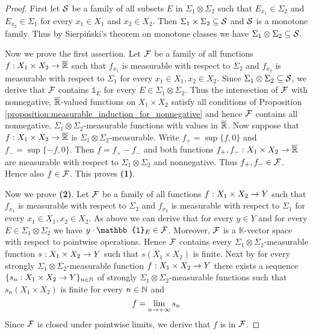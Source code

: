 \begin{proof}
    First let ${\mathcal S}$ be a family of all subsets $E$ in $\Sigma_1\otimes \Sigma_2$ such that $E_{x_1}\in \Sigma_2$ and $E_{x_2}\in \Sigma_1$ for every $x_1\in X_1$ and $x_2\in X_2$. Then $\Sigma_1\times \Sigma_2\subseteq {\mathcal S}$ and ${\mathcal S}$ is a monotone family. Thus by Sierpiński's theorem on monotone classes we have $\Sigma_1\otimes \Sigma_2\subseteq {\mathcal S}$.

    Now we prove the first assertion. Let ${\mathcal F}$ be a family of all functions $f:X_1\times X_2\rightarrow \overline{{\mathbb R}}$ such that $f_{x_1}$ is measurable with respect to $\Sigma_2$ and $f_{x_2}$ is measurable with respect to $\Sigma_1$ for every $x_1\in X_1,x_2\in X_2$. Since $\Sigma_1\otimes \Sigma_2\subseteq {\mathcal S}$, we derive that ${\mathcal F}$ contains $\mathbb{1}_E$ for every $E\in \Sigma_1\otimes \Sigma_2$. Thus the intersection of ${\mathcal F}$ with nonnegative, $\overline{{\mathbb R}}$-valued functions on $X_1\times X_2$ satisfy all conditions of Proposition \ref{proposition:measurable_induction_for_nonnegative} and hence ${\mathcal F}$ contains all nonnegative, $\Sigma_1\otimes \Sigma_2$-measurable functions with values in $\overline{{\mathbb R}}$. Now suppose that $f:X_1\times X_2\rightarrow \overline{{\mathbb R}}$ is $\Sigma_1\otimes \Sigma_2$-measurable. Write $f_+ = \sup\{f, 0\}$ and $f_- = \sup\{-f, 0\}$. Then $f = f_+ - f_-$ and both functions $f_+,f_-:X_1\times X_2\rightarrow \overline{{\mathbb R}}$ are measurable with respect to $\Sigma_1\otimes \Sigma_2$ and nonnegative. Thus $f_+,f_-\in {\mathcal F}$. Hence also $f\in {\mathcal F}$. This proves \textbf{(1)}.

    Now we prove \textbf{(2)}. Let ${\mathcal F}$ be a family of all functions $f:X_1\times X_2\rightarrow Y$ such that $f_{x_1}$ is measurable with respect to $\Sigma_2$ and $f_{x_2}$ is measurable with respect to $\Sigma_1$ for every $x_1\in X_1,x_2\in X_2$. As above we can derive that for every $y\in Y$ and for every $E\in \Sigma_1\otimes \Sigma_2$ we have $y\cdot \mathbb{1}_E\in \cF$. Moreover, ${\mathcal F}$ is a $\mathbb{K}$-vector space with respect to pointwise operations. Hence ${\mathcal F}$ contains every $\Sigma_1\otimes \Sigma_2$-measurable function $s:X_1\times X_2\rightarrow Y$ such that $s(X_1\times X_2)$ is finite. Next by \cite{Integration} for every strongly $\Sigma_1\otimes \Sigma_2$-measurable function $f:X_1\times X_2\rightarrow Y$ there exists a sequence $\{s_n:X_1\times X_2\rightarrow Y\}_{n\in {\mathbb N}}$ of strongly $\Sigma_1\otimes \Sigma_2$-measurable functions such that $s_n(X_1\times X_2)$ is finite for every $n\in {\mathbb N}$ and
    $$f = \lim_{n\rightarrow +\infty}s_n$$
    Since ${\mathcal F}$ is closed under pointwise limits, we derive that $f$ is in ${\mathcal F}$.
\end{proof}

